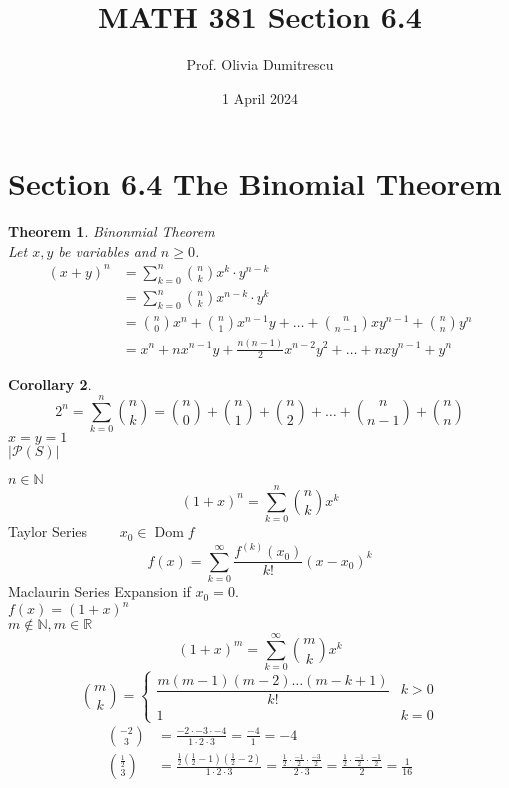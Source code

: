 \documentclass[letterpaper, 12pt]{article}
\title{MATH 381 Section 6.4}
\author{Prof. Olivia Dumitrescu}
\date{1 April 2024}
\newtheorem{theorem}{Theorem}[section]
\newtheorem{corollary}[theorem]{Corollary}
\DeclareMathOperator{\Dom}{Dom}
\newcommand{\N}{\mathbb{N}}
\newcommand{\R}{\mathbb{R}}
\newcommand{\0}{\emptyset}
\newcommand{\power}{\mathcal{P}}
\begin{document}
    \maketitle
    \section*{Section 6.4 The Binomial Theorem}
    \begin{theorem}
        Binonmial Theorem \\
        Let $x, y$ be variables and $n \ge 0$.
        \[\begin{split} (x + y)^n &= \sum_{k=0}^{n} \binom{n}{k} x^k \cdot y^{n-k} \\
            &= \sum_{k=0}^{n} \binom{n}{k} x^{n-k} \cdot y^k \\
            &= \binom{n}{0}x^n + \binom{n}{1}x^{n-1}y + \dots 
            + \binom{n}{n-1}xy^{n-1} + \binom{n}{n}y^n \\
            &= x^n + nx^{n-1}y + \frac{n(n-1)}{2}x^{n-2}y^2 + \dots 
            + nxy^{n-1} + y^n
        \end{split}\]
    \end{theorem}
    \begin{corollary}
        \[2^n = \sum_{k=0}^{n} \binom{n}{k} = 
        \binom{n}{0} + \binom{n}{1} + \binom{n}{2} + \dots + \binom{n}{n-1} + \binom{n}{n}\]
        $x = y = 1$ \\
        $|\power(S)|$
    \end{corollary}
    $n \in \N$
    \[(1 + x)^n = \sum_{k=0}^{n} \binom{n}{k} x^k\]
    Taylor Series $\qquad x_0 \in \Dom f$
    \[f(x) = \sum_{k=0}^{\infty} \frac{f^{(k)}(x_0)}{k!} (x - x_0)^k\]
    Maclaurin Series Expansion if $x_0 = 0$. \\
    $f(x) = (1 + x)^n$ \\
    $m \notin \N, m \in \R$
    \[(1 + x)^m = \sum_{k=0}^{\infty} \binom{m}{k} x^k\]
    \[\binom{m}{k} = \begin{cases}
        \dfrac{m(m-1)(m-2)\dots(m-k+1)}{k!} & k > 0 \\
        1 & k = 0
    \end{cases}\]
    \begin{align*}
        \binom{-2}{3} &= \frac{-2 \cdot -3 \cdot -4}{1 \cdot 2 \cdot 3} = \frac{-4}{1} = -4 \\
        \binom{\frac{1}{2}}{3} &= \frac{\frac{1}{2}(\frac{1}{2}-1)(\frac{1}{2}-2)}{1 \cdot 2 \cdot 3} 
        = \frac{\frac{1}{2} \cdot \frac{-1}{2} \cdot \frac{-3}{2}}{2 \cdot 3} 
        = \frac{\frac{1}{2} \cdot \frac{-1}{2} \cdot \frac{-1}{2}}{2}  = \frac{1}{16}
    \end{align*}
\end{document}
